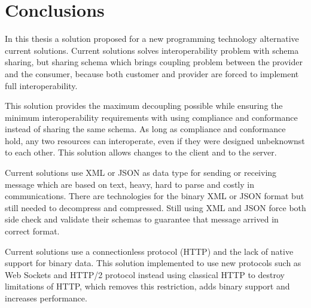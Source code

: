 \documentclass[runningheads,a4paper]{llncs}
\begin{document}
\section{Conclusions}
In this thesis a solution proposed for a new programming technology alternative current solutions. Current solutions solves interoperability problem with schema sharing, but sharing schema which brings coupling problem between the provider and the consumer, because both customer and provider are forced to implement full interoperability.

This solution provides the maximum decoupling possible while ensuring the minimum interoperability requirements with using compliance and conformance instead of sharing the same schema. As long as compliance and conformance hold, any two resources can interoperate, even if they were designed unbeknownst to each other. This solution allows changes to the client and to the server.

Current solutions use XML or JSON as data type for sending or receiving message which are based on text, heavy, hard to parse and costly in communications. There are technologies for the binary XML or JSON format but still needed to decompress and compressed. Still using XML and JSON force both side check and validate their schemas to guarantee that message arrived in correct format.

Current solutions use a connectionless protocol (HTTP) and the lack of native support for binary data. This solution implemented to use new protocols such as Web Sockets and HTTP/2 protocol instead using classical HTTP to destroy limitations of HTTP, which removes this restriction, adds binary support and increases performance.
\end{document}
